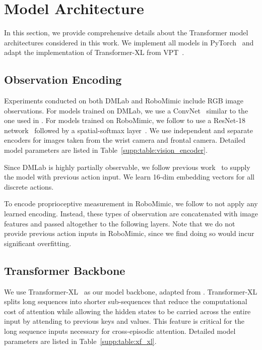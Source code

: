 \section{Model Architecture}
\label{supp:sec:model_architecture}

In this section, we provide comprehensive details about the Transformer model architectures considered in this work.
We implement all models in PyTorch~\citep{Paszke2019PyTorch} and adapt the implementation of Transformer-XL from VPT~\citep{openai2022vpt}.

\subsection{Observation Encoding}
Experiments conducted on both DMLab and RoboMimic include RGB image observations.
For models trained on DMLab, we use a ConvNet~\citep{he2015resnet} similar to the one used in \citet{espeholt2018impala}. 
For models trained on RoboMimic, we follow \citet{mandlekar2021matters} to use a ResNet-18 network~\citep{he2015resnet} followed by a spatial-softmax layer~\citep{finn2015deep}. We use independent and separate encoders for images taken from the wrist camera and frontal camera.
Detailed model parameters are listed in Table~\ref{supp:table:vision_encoder}.




Since DMLab is highly partially observable, we follow previous work~\citep{espeholt2018impala,fan2022minedojo,openai2022vpt} to supply the model with previous action input.
We learn 16-dim embedding vectors for all discrete actions.

To encode proprioceptive measurement in RoboMimic, we follow \citet{mandlekar2021matters} to not apply any learned encoding. Instead, these types of observation are concatenated with image features and passed altogether to the following layers.
Note that we do not provide previous action inputs in RoboMimic, since we find doing so would incur significant overfitting.

\subsection{Transformer Backbone}
We use Transformer-XL~\citep{dai2019transformerxl} as our model backbone, adapted from \citet{openai2022vpt}. Transformer-XL splits long sequences into shorter sub-sequences that reduce the computational cost of attention while allowing the hidden states to be carried across the entire input by attending to previous keys and values.
This feature is critical for the long sequence inputs necessary for cross-episodic attention.
Detailed model parameters are listed in Table~\ref{supp:table:xf_xl}.

